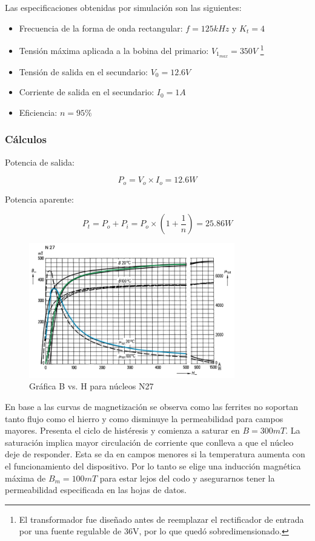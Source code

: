 Las especificaciones obtenidas por simulación son las siguientes:
\begin{itemize}
    \item Frecuencia de la forma de onda rectangular: $f=125kHz$ y $K_{t}=4$
    \item Tensión máxima aplicada a la bobina del primario: $V_{1_{max}}=350V$ \footnote{El transformador fue diseñado antes de reemplazar el rectificador de entrada por una fuente regulable de 36V, por lo que quedó sobredimensionado.}
    \item Tensión de salida en el secundario: $V_{0}=12.6V$
    \item Corriente de salida en el secundario: $I_{0}=1A$
    \item Eficiencia: $n=95\%$
\end{itemize}

\subsubsection{Cálculos}

Potencia de salida:

$$ P_{o}=V_{o}\times I_{o}=12.6W $$

Potencia aparente: 

$$ P_t=P_o+P_i=P_o\times\left(1+\frac{1}{n}\right)=25.86W  $$

\begin{figure}[ht]
    \centering
    \includegraphics[width=0.8\textwidth]{images/diseno-trafos-kike/tabla_bh_kike.png}
    \caption{Gráfica B vs. H para núcleos N27}
    \label{fig:grafica-b-h}
\end{figure}

En base a las curvas de magnetización se observa como las ferrites no soportan tanto flujo como el hierro y como disminuye la permeabilidad para campos mayores.  
Presenta el ciclo de histéresis y comienza a saturar en $B=300mT$. 
La saturación implica mayor circulación de corriente que conlleva a que el núcleo deje de responder. 
Esta se da en campos menores si la temperatura aumenta con el funcionamiento del dispositivo. 
Por lo tanto se elige una inducción magnética máxima de $B_{m}=100mT$ para estar lejos del codo y asegurarnos tener la permeabilidad especificada en las hojas de datos. 

